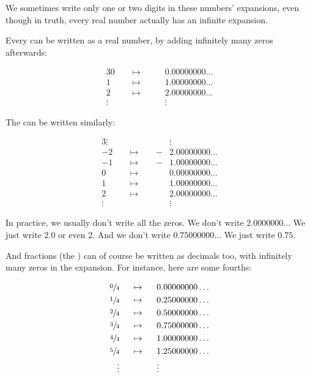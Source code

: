 \documentclass[../../../main.tex]{subfiles}
\begin{document}
We sometimes write only one or two digits in these numbers' expansions, even though in truth, every real number actually has an infinite expansion.

Every  can be written as a real number, by adding infinitely many zeros afterwards:

\begin{alignat*}{3}
       0 &&~~\mapsto~~&&  &0.00000000\ldots \\
       1 &&~~\mapsto~~&&  &1.00000000\ldots \\
       2 &&~~\mapsto~~&&  &2.00000000\ldots \\
  \vdots &&           &&  &\vdots
\end{alignat*}

The  can be written similarly:

\begin{alignat*}{3}
  \vdots &&           &&  &\vdots \\
      -2 &&~~\mapsto~~&& -&2.00000000\ldots \\
      -1 &&~~\mapsto~~&& -&1.00000000\ldots \\
       0 &&~~\mapsto~~&&  &0.00000000\ldots \\
       1 &&~~\mapsto~~&&  &1.00000000\ldots \\
       2 &&~~\mapsto~~&&  &2.00000000\ldots \\
  \vdots &&           &&  &\vdots
\end{alignat*}

\begin{aside}
  \begin{remark}
    In practice, we usually don't write all the zeros. We don't write $2.0000000\ldots$ We just write $2.0$ or even $2$. And we don't write $0.75000000\ldots$ We just write $0.75$.
  \end{remark}
\end{aside}

And fractions (the ) can of course be written as decimals too, with infinitely many zeros in the expansion. For instance, here are some fourths:

\begin{alignat*}{3}
  \sfrac{0}{4} &&~~\mapsto~~&& &0.00000000\ldots \\
  \sfrac{1}{4} &&~~\mapsto~~&& &0.25000000\ldots \\
  \sfrac{2}{4} &&~~\mapsto~~&& &0.50000000\ldots \\
  \sfrac{3}{4} &&~~\mapsto~~&& &0.75000000\ldots \\
  \sfrac{4}{4} &&~~\mapsto~~&& &1.00000000\ldots \\
  \sfrac{5}{4} &&~~\mapsto~~&& &1.25000000\ldots \\
  \vdots &&           &&  &\vdots
\end{alignat*}
\end{document}

